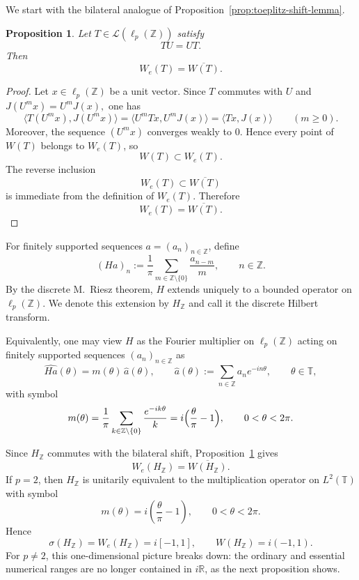 \documentclass[11pt]{amsart}
\numberwithin{equation}{section}
\newtheorem{proposition}[theorem]{Proposition}
\theoremstyle{definition}
\theoremstyle{remark}
\newcommand{\ip}[2]{\langle #1,#2\rangle}
\newcommand{\We}{W_e}
\begin{document}
We start with the bilateral analogue of Proposition~\ref{prop:toeplitz-shift-lemma}.
\begin{proposition}\label{prop:bilateral-shift-commuting-ellp}
Let $T\in \mathcal L(\ell_p(\mathbb Z))$ satisfy
\[
TU=UT.
\]
Then
\[
\We(T)=\overline{W(T)}.
\]
\end{proposition}

\begin{proof}
Let $x\in \ell_p(\mathbb Z)$ be a unit vector. Since $T$ commutes with $U$ and $J(U^m x)=U^mJ(x),$
 one has
\[
\ip{T(U^m x)}{J(U^m x)}=\ip{U^mTx}{U^mJ(x)}=\ip{Tx}{J(x)}
\qquad (m\ge 0).
\]
 Moreover, the sequence $(U^m x)$ converges weakly to $0$. Hence every point of $W(T)$ belongs to $\We(T)$, so
\[
W(T)\subset \We(T).
\]
The reverse inclusion
\[
\We(T)\subset \overline{W(T)}
\]
is immediate from the definition of $\We(T)$. Therefore
\[
\We(T)=\overline{W(T)}.
\]
\end{proof}


For finitely supported sequences $a=(a_n)_{n\in\mathbb Z}$, define
\[
(Ha)_n:=\frac1\pi\sum_{m\in\mathbb Z\setminus\{0\}}\frac{a_{n-m}}{m},
\qquad n\in\mathbb Z.
\]
By the discrete M.~Riesz theorem, $H$ extends uniquely to a bounded operator on
$\ell_p(\mathbb Z)$. We denote this extension by $H_{\mathbb Z}$ and call it
the discrete Hilbert transform. 

Equivalently, one may view $H$ as the 
Fourier multiplier on $\ell_p(\mathbb Z)$ acting on finitely supported sequences $(a_n)_{n \in \mathbb Z}$ as 
\[
\widehat{Ha}(\theta)=m(\theta)\,\widehat a(\theta),
\qquad
\widehat a(\theta):=\sum_{n\in\mathbb Z} a_n e^{-in\theta},
\qquad \theta\in\mathbb T,
\]
with symbol
\[
m(\theta)=\frac1\pi\sum_{k\in\mathbb Z\setminus\{0\}}\frac{e^{-ik\theta}}{k}
=i\Bigl(\frac{\theta}{\pi}-1\Bigr),
\qquad 0<\theta<2\pi.
\]

Since $H_{\mathbb Z}$ commutes with the bilateral shift,
Proposition~\ref{prop:bilateral-shift-commuting-ellp} gives
\[
\We(H_{\mathbb Z})=\overline{W(H_{\mathbb Z})}.
\]
If \(p=2\), then \(H_{\mathbb Z}\) is unitarily equivalent to the
multiplication operator on \(L^2(\mathbb T)\) with symbol
\[
        m(\theta)=i\left(\frac{\theta}{\pi}-1\right),
        \qquad 0<\theta<2\pi .
\]
Hence
\[
        \sigma(H_{\mathbb Z})=W_e(H_{\mathbb Z})=i[-1,1],
        \qquad
        W(H_{\mathbb Z})=i(-1,1).
\]
For \(p\ne2\), this one-dimensional picture breaks down: the ordinary and
essential numerical ranges are no longer contained in \(i\mathbb R\), as the
next proposition shows.
\end{document}
